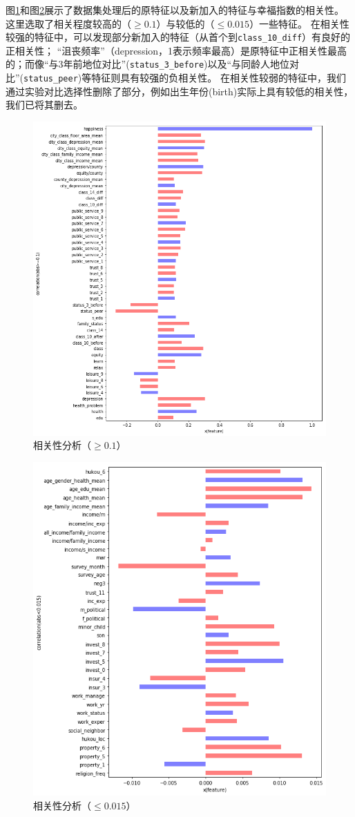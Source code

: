 \documentclass[logo,reportComp]{thesis}
\begin{document}
图\ref{fig:corr}和图\ref{fig:-corr}展示了数据集处理后的原特征以及新加入的特征与幸福指数的相关性。
这里选取了相关程度较高的（$\ge0.1$）与较低的（$\leq 0.015$）一些特征。
在相关性较强的特征中，可以发现部分新加入的特征（从首个到\verb'class_10_diff'）有良好的正相关性；
“沮丧频率”（depression，1表示频率最高）是原特征中正相关性最高的；而像“与3年前地位对比”(\verb'status_3_before')以及“与同龄人地位对比”(\verb'status_peer')等特征则具有较强的负相关性。
在相关性较弱的特征中，我们通过实验对比选择性删除了部分，例如出生年份(birth)实际上具有较低的相关性，我们已将其删去。


\begin{figure}[H]
\includegraphics[width=0.8\linewidth]{fig/corr.png}
\caption{相关性分析（$\ge 0.1$）}
\label{fig:corr}
\end{figure}

\begin{figure}[H]
\includegraphics[width=0.8\linewidth]{fig/-corr.png}
\caption{相关性分析（$\leq 0.015$）}
\label{fig:-corr}
\end{figure}
\end{document}
